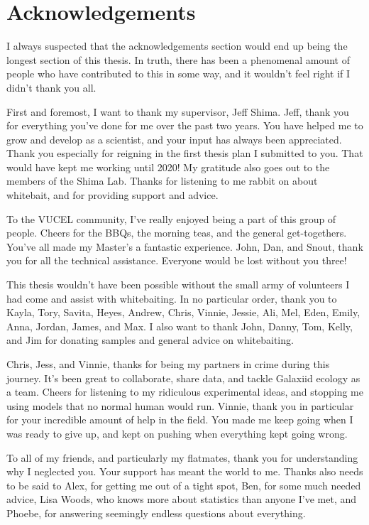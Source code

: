 \documentclass[]{book}
\begin{document}
\section{Acknowledgements}\label{acknowledgements}

I always suspected that the acknowledgements section would end up being
the longest section of this thesis. In truth, there has been a
phenomenal amount of people who have contributed to this in some way,
and it wouldn't feel right if I didn't thank you all.

First and foremost, I want to thank my supervisor, Jeff Shima. Jeff,
thank you for everything you've done for me over the past two years. You
have helped me to grow and develop as a scientist, and your input has
always been appreciated. Thank you especially for reigning in the first
thesis plan I submitted to you. That would have kept me working until
2020! My gratitude also goes out to the members of the Shima Lab. Thanks
for listening to me rabbit on about whitebait, and for providing support
and advice.

To the VUCEL community, I've really enjoyed being a part of this group
of people. Cheers for the BBQs, the morning teas, and the general
get-togethers. You've all made my Master's a fantastic experience. John,
Dan, and Snout, thank you for all the technical assistance. Everyone
would be lost without you three!

This thesis wouldn't have been possible without the small army of
volunteers I had come and assist with whitebaiting. In no particular
order, thank you to Kayla, Tory, Savita, Heyes, Andrew, Chris, Vinnie,
Jessie, Ali, Mel, Eden, Emily, Anna, Jordan, James, and Max. I also want
to thank John, Danny, Tom, Kelly, and Jim for donating samples and
general advice on whitebaiting.

Chris, Jess, and Vinnie, thanks for being my partners in crime during
this journey. It's been great to collaborate, share data, and tackle
Galaxiid ecology as a team. Cheers for listening to my ridiculous
experimental ideas, and stopping me using models that no normal human
would run. Vinnie, thank you in particular for your incredible amount of
help in the field. You made me keep going when I was ready to give up,
and kept on pushing when everything kept going wrong.

To all of my friends, and particularly my flatmates, thank you for
understanding why I neglected you. Your support has meant the world to
me. Thanks also needs to be said to Alex, for getting me out of a tight
spot, Ben, for some much needed advice, Lisa Woods, who knows more about
statistics than anyone I've met, and Phoebe, for answering seemingly
endless questions about everything.
\end{document}
